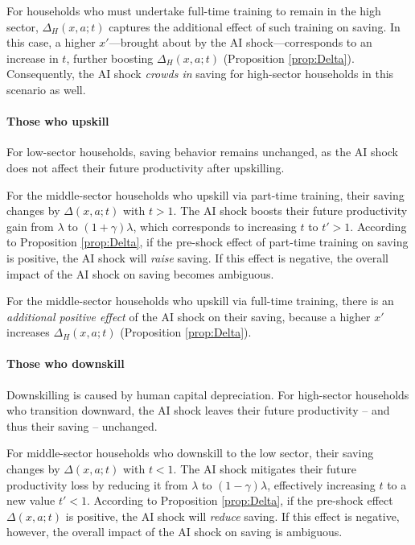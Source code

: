 \documentclass[12pt,english]{article}
\numberwithin{equation}{section}
\begin{document}
{For households who must undertake full-time training to remain in the high sector, $\Delta_{H}(x,a;t)$ captures the additional effect of such training on saving. In this case, a higher $x'$—brought about by the AI shock—corresponds to an increase in $t$, further boosting $\Delta_{H}(x,a;t)$ (Proposition \ref{prop:Delta}). Consequently, the AI shock \textit{crowds in} saving for high-sector households in this scenario as well.


\paragraph{Those who upskill} For low-sector households, saving behavior remains unchanged, as the AI shock does not affect their future productivity after upskilling.

For the middle-sector households who upskill via part-time training, their saving changes by $\Delta(x,a;t)$ with $t>1$. The AI shock boosts their future productivity gain from $\lambda$ to $(1+\gamma)\lambda$, which corresponds to increasing $t$ to $t'>1$. According to Proposition \ref{prop:Delta}, if the pre-shock effect of part-time training on saving is positive, the AI shock will \textit{raise} saving. If this effect is negative, the overall impact of the AI shock on saving becomes ambiguous.

For the middle-sector households who upskill via full-time training, there is an \textit{additional positive effect} of the AI shock on their saving, because a higher $x'$ increases $\Delta_{H}(x,a;t)$ (Proposition \ref{prop:Delta}).



\paragraph{Those who downskill} Downskilling is caused by human capital depreciation. For high-sector households who transition downward, the AI shock leaves their future productivity -- and thus their saving -- unchanged.

For middle-sector households who downskill to the low sector, their saving changes by $\Delta(x,a;t)$ with $t<1$. The AI shock mitigates their future productivity loss by reducing it from $\lambda$ to $(1-\gamma)\lambda$, effectively increasing $t$ to a new value $t'<1$. According to Proposition \ref{prop:Delta}, if the pre-shock effect $\Delta(x,a;t)$ is positive, the AI shock will \textit{reduce} saving. If this effect is negative, however, the overall impact of the AI shock on saving is ambiguous.






}
\end{document}
